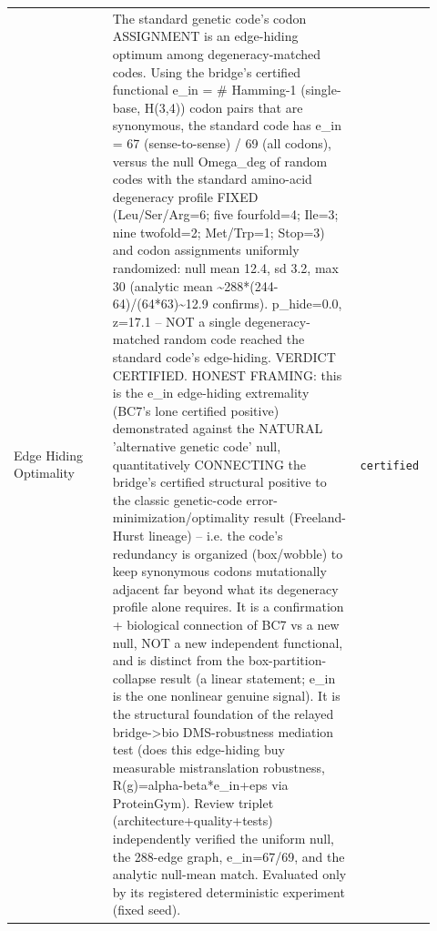 \begin{longtable}{>{\raggedright\arraybackslash}p{0.22\linewidth}>{\raggedright\arraybackslash}p{0.55\linewidth}>{\raggedright\arraybackslash}p{0.15\linewidth}}
Edge Hiding Optimality & The standard genetic code's codon ASSIGNMENT is an edge-hiding optimum among degeneracy-matched codes. Using the bridge's certified functional e\_in = \# Hamming-1 (single-base, H(3,4)) codon pairs that are synonymous, the standard code has e\_in = 67 (sense-to-sense) / 69 (all codons), versus the null Omega\_deg of random codes with the standard amino-acid degeneracy profile FIXED (Leu/Ser/Arg=6; five fourfold=4; Ile=3; nine twofold=2; Met/Trp=1; Stop=3) and codon assignments uniformly randomized: null mean 12.4, sd 3.2, max 30 (analytic mean \textasciitilde{}288*(244-64)/(64*63)\textasciitilde{}12.9 confirms). p\_hide=0.0, z=17.1 -- NOT a single degeneracy-matched random code reached the standard code's edge-hiding. VERDICT CERTIFIED. HONEST FRAMING: this is the e\_in edge-hiding extremality (BC7's lone certified positive) demonstrated against the NATURAL 'alternative genetic code' null, quantitatively CONNECTING the bridge's certified structural positive to the classic genetic-code error-minimization/optimality result (Freeland-Hurst lineage) -- i.e. the code's redundancy is organized (box/wobble) to keep synonymous codons mutationally adjacent far beyond what its degeneracy profile alone requires. It is a confirmation + biological connection of BC7 vs a new null, NOT a new independent functional, and is distinct from the box-partition-collapse result (a linear statement; e\_in is the one nonlinear genuine signal). It is the structural foundation of the relayed bridge->bio DMS-robustness mediation test (does this edge-hiding buy measurable mistranslation robustness, R(g)=alpha-beta*e\_in+eps via ProteinGym). Review triplet (architecture+quality+tests) independently verified the uniform null, the 288-edge graph, e\_in=67/69, and the analytic null-mean match. Evaluated only by its registered deterministic experiment (fixed seed). & \texttt{certified} \\

\end{longtable}
